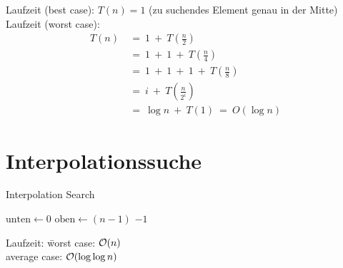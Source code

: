 \begin{enumerate}[1.]
        Laufzeit (best case): $T(n) = 1$ (zu suchendes Element genau in der Mitte)\\
        Laufzeit (worst case): 
        \begin{align*}
            T(n)~&=~1~+~T \left( \frac{n}{2} \right)\\
            &=~1~+~1~+~T \left( \frac{n}{4} \right)\\
            &=~1~+~1~+~1~+~T \left( \frac{n}{8} \right)\\
            &=~i~+~T \left( \frac{n}{2^{i}} \right)\tag{i-ter Schritt}\\
            &=~\log n~+~T(1)~=~O \left( \log n \right)
        \end{align*}
    \end{enumerate}

    \section{Interpolationssuche}
		\begin{algorithm}
        		\caption{Interpolation Search}
        		\label{alg:interpolationsSearch}
        		\begin{algorithmic}[1]
        			    \State $\text{unten} \gets 0$
        			    \State $\text{oben} \gets (n-1)$ 
                            \Else 
                            \EndIf    
        				\EndWhile
        				\State \Return $-1$
        			\EndFunction
        		\end{algorithmic}
        	\end{algorithm}
        \begin{tabbing}
            Laufzeit: \= worst case: $\mathcal{O}(n)$\\
            \> average case: $\mathcal{O}(\log \log n)$\\
        \end{tabbing}

